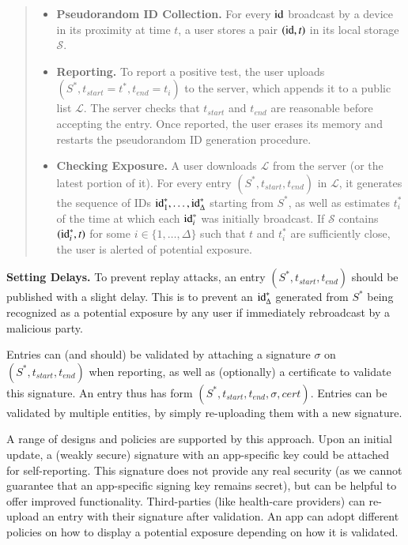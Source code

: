 \begin{quote}
\begin{itemize}
\item {\bf Pseudorandom ID Collection.} For every $\mathrm{id}$ broadcast by a device in its proximity at time $t$, a user stores a pair $(\mathrm{id}, t)$ in its local storage $\mathcal{S}$.
\item {\bf Reporting.} To report a positive test, the user uploads $(S^*, t_{start}=t^*, t_{end}=t_i)$ to the server, which appends it to a public list $\mathcal{L}$. The server checks that $t_{start}$ and $t_{end}$ are reasonable before accepting the entry. Once reported, the user erases its memory and restarts the pseudorandom ID generation procedure.
\item {\bf Checking Exposure.} A user downloads $\mathcal{L}$ from the server (or the latest portion of it). For every entry $(S^*,t_{start}, t_{end})$ in $\mathcal{L}$, it generates the sequence of IDs $\mathrm{id}^*_1, \ldots, \mathrm{id}^*_{\Delta}$ starting from $S^*$, as well as  estimates $t_i^*$ of the time at which each $\mathrm{id}_i^*$ was initially broadcast. If $\mathcal{S}$ contains $(\mathrm{id}_i^*, t)$ for some $i \in \{1, \ldots, \Delta\}$ such that $t$ and $t_i^*$ are sufficiently close, the user is alerted of potential exposure.
\end{itemize}
\end{quote}
{\bf Setting Delays.} To prevent replay attacks, an entry $(S^*,t_{start}, t_{end})$ should be published with a slight delay. This is to prevent an $\mathrm{id}^*_{\Delta}$ generated from $S^*$ being recognized as a potential exposure by any user if immediately rebroadcast by a malicious party.

 Entries can (and should) be validated by attaching a signature $\sigma$ on $(S^*, t_{start}, t_{end})$ when reporting, as well as (optionally) a certificate to validate this signature. An entry thus has form $(S^*, t_{start}, t_{end}, \sigma, cert)$. Entries can be validated by multiple entities, by simply re-uploading them with a new signature.

A range of designs and policies are supported by this approach. Upon an initial update, a (weakly secure) signature with an app-specific key could be attached for self-reporting. This signature does not provide any real security (as we cannot guarantee that an app-specific signing key remains secret), but can be helpful to offer improved functionality.  
%
Third-parties (like health-care providers) can re-upload an entry with their signature after validation. An app can adopt different policies on how to display a potential exposure depending on how it is validated.

